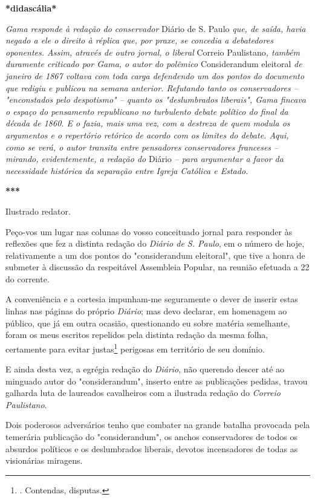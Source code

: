 \textbf{*didascália*}

\emph{Gama responde à redação do conservador} Diário de S. Paulo
\emph{que, de saída, havia negado a ele o direito à réplica que, por
praxe, se concedia a debatedores oponentes. Assim, através de outro
jornal, o liberal} Correio Paulistano\emph{, também duramente criticado
por Gama, o autor do polêmico} Considerandum eleitoral \emph{de janeiro
de 1867 voltava com toda carga defendendo um dos pontos do documento que
redigiu e publicou na semana anterior. Refutando tanto os conservadores
-- "enconstados pelo despotismo" -- quanto os "deslumbrados liberais",
Gama fincava o espaço do pensamento republicano no turbulento debate
político do final da década de 1860. E o fazia, mais uma vez, com a
destreza de quem modula os argumentos e o repertório retórico de acordo
com os limites do debate. Aqui, como se verá, o autor transita entre
pensadores conservadores franceses -- mirando, evidentemente, a redação
do} Diário \emph{-- para argumentar a favor da necessidade histórica da
separação entre Igreja Católica e Estado.}

\textbf{***}

Ilustrado redator.

Peço-vos um lugar nas colunas do vosso conceituado jornal para responder
às reflexões que fez a distinta redação do \emph{Diário de S. Paulo}, em
o número de hoje, relativamente a um dos pontos do "considerandum
eleitoral", que tive a honra de submeter à discussão da respeitável
Assembleia Popular, na reunião efetuada a 22 do corrente.

A conveniência e a cortesia impunham-me seguramente o dever de inserir
estas linhas nas páginas do próprio \emph{Diário}; mas devo declarar, em
homenagem ao público, que já em outra ocasião, questionando eu sobre
matéria semelhante, foram os meus escritos repelidos pela distinta
redação da mesma folha, certamente para evitar justas\footnote{.
  Contendas, disputas.} perigosas em território de seu domínio.

E ainda desta vez, a egrégia redação do \emph{Diário}, não querendo
descer até ao minguado autor do "considerandum", inserto entre as
publicações pedidas, travou galharda luta de laureados cavalheiros com a
ilustrada redação do \emph{Correio Paulistano}.

Dois poderosos adversários tenho que combater na grande batalha
provocada pela temerária publicação do "considerandum", os anchos
conservadores de todos os absurdos políticos e os deslumbrados liberais,
devotos incensadores de todas as visionárias miragens.

